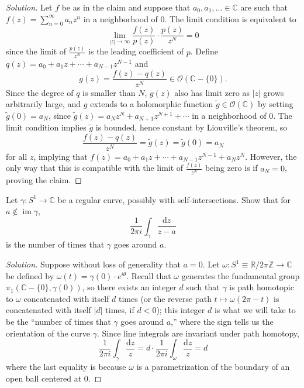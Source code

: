 \documentclass[10pt]{article}
\newcommand{\dd}{\mathrm{d}}
\providecommand{\CC}{\mathbb C}
\providecommand{\RR}{\mathbb R}
\providecommand{\ZZ}{\mathbb Z}
\newenvironment{soln}{\begin{proof}[Solution]}{\end{proof}}
\providecommand{\abs}[1]{\left\lvert #1\right\rvert}
\providecommand{\im}{\operatorname{im}}
\begin{document}
\begin{soln}
    Let $f$ be as in the claim and suppose that
    $a_0,a_1,\dots\in\CC$ are such that $f(z) = \sum_{n=0}^\infty a_nz^n$
    in a neighborhood of $0$. The limit condition is equivalent to
    \begin{equation*}
	\lim_{\abs{z}\to\infty} \frac{f(z)}{p(z)}\cdot\frac{p(z)}{z^N} = 0
    \end{equation*}
    since the limit of $\frac{p(z)}{z^N}$ is the leading coefficient of $p$.
    Define $q(z) = a_0 + a_1z + \cdots + a_{N-1}z^{N-1}$ and
    \begin{equation*}
	g(z) = \frac{f(z) - q(z)}{z^N}\in\mathcal O(\CC - \{0\}).
    \end{equation*}
    Since the degree of $q$ is smaller than $N$,
    $g(z)$ also has limit zero as $\abs z$ grows arbitrarily large,
    and $g$ extends to a holomorphic function
    $\tilde g\in\mathcal O(\CC)$ by setting $\tilde g(0) = a_N$,
    since $\tilde g(z) = a_Nz^N + a_{N+1}z^{N+1} + \cdots$
    in a neighborhood of $0$.
    The limit condition implies $\tilde g$ is bounded,
    hence constant by Liouville's theorem, so
    \[
	\frac{f(z) - q(z)}{z^N} = \tilde g(z) = \tilde g(0) = a_N
    \]
    for all $z$, implying that
    $f(z) = a_0 + a_1z + \cdots + a_{N-1}z^{N-1} + a_Nz^N$.
    However, the only way that this is compatible with the limit
    of $\frac{f(z)}{z^N}$ being zero is if $a_N = 0$,
    proving the claim.
\end{soln}

\begin{problem}
    Let $\gamma\colon S^1\to\CC$ be a regular curve,
    possibly with self-intersections.
    Show that for $a\notin\im\gamma$,
    \begin{equation*}
	\frac 1{2\pi i}\int_\gamma \frac{\dd z}{z-a}
    \end{equation*}
    is the number of times that $\gamma$ goes around $a$.
\end{problem}

\begin{soln}
    Suppose without loss of generality that $a = 0$.
    Let $\omega\colon S^1\equiv\RR/2\pi\ZZ\to\CC$ be defined by
    $\omega(t) = \gamma(0)\cdot e^{i\theta}$. Recall that
    $\omega$ generates the fundamental group $\pi_1(\CC-\{0\},\gamma(0))$,
    so there exists an integer $d$ such that
    $\gamma$ is path homotopic to $\omega$ concatenated with itself $d$ times
    (or the reverse path $t\mapsto \omega(2\pi - t)$
    is concatenated with itself $\abs d$ times, if $d < 0$);
    this integer $d$ is what we will take to be
    the ``number of times that $\gamma$ goes around $a$,''
    where the sign tells us the orientation of the curve $\gamma$.
    Since line integrals are invariant under path homotopy,
    \begin{equation*}
	\frac 1{2\pi i}\int_{\gamma}\frac{\dd z}z
	= d\cdot \frac 1{2\pi i}\int_{\omega}\frac{\dd z}z = d
    \end{equation*}
    where the last equality is because $\omega$ is a parametrization
    of the boundary of an open ball centered at $0$.
\end{soln}
\end{document}
